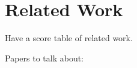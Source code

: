\section{Related Work}
\label{sec:rel_work}

Have a score table of related work.

Papers to talk about:
